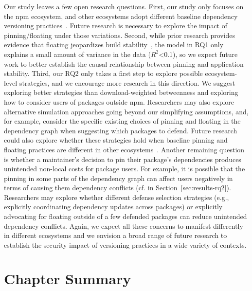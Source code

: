 Our study leaves a few open research questions.
First, our study only focuses on the npm ecosystem, and other ecosystems adopt different baseline dependency versioning practices~\cite{DBLP:journals/tosem/BogartKHT21, DBLP:conf/msr/0001PSTB19}.
Future research is necessary to explore the impact of pinning/floating under those variations.
Second, while prior research provides evidence that floating jeopardizes build stability~\cite[e.g.,][]{DBLP:conf/issta/MukherjeeAR21}, the  model in RQ1 only explains a small amount of variance in the data ($R^2$<0.1), so we expect future work to better establish the causal relationship between pinning and application stability.
Third, our RQ2 only takes a first step to explore possible ecosystem-level strategies, and we encourage more research in this direction. 
We suggest exploring better strategies than download-weighted betweenness and exploring how to consider users of packages outside npm.  
Researchers may also explore alternative simulation approaches going beyond our simplifying assumptions, and, for example, consider the specific existing choices of pinning and floating in the dependency graph when suggesting which packages to defend. 
Future research could also explore whether these strategies hold when baseline pinning and floating practices are different in other ecosystems~\cite{DBLP:journals/tosem/BogartKHT21, DBLP:conf/msr/0001PSTB19}.
Another remaining question is whether a maintainer's decision to pin their package's dependencies produces unintended non-local costs for package users. 
For example, it is possible that the pinning in some parts of the dependency graph can affect users negatively in terms of causing them dependency conflicts (cf.  in Section~\ref{sec:results-rq2}). 
Researchers may explore whether different defense selection strategies (e.g., explicitly coordinating dependency updates across packages) or explicitly advocating for floating outside of a few defended packages can reduce unintended dependency conflicts.
Again, we expect all these concerns to manifest differently in different ecosystems and we envision a broad range of future research to establish the security impact of versioning practices in a wide variety of contexts.

\section{Chapter Summary}
\label{sec:data-availability}

